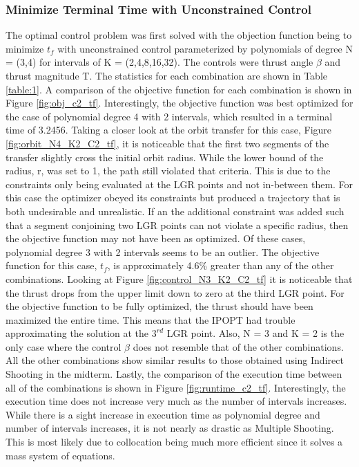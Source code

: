 \documentclass[]{article}
\begin{document}
    \subsubsection{Minimize Terminal Time with Unconstrained Control}
	 The optimal control problem was first solved with the objection function being to minimize \(t_f\) with unconstrained control parameterized by polynomials of degree N = (3,4) for intervals of K = (2,4,8,16,32). The controls were thrust angle \(\beta\) and thrust magnitude T. The statistics for each combination are shown in Table \ref{table:1}. A comparison of the objective function for each combination is shown in Figure \ref{fig:obj_c2_tf}. Interestingly, the objective function was best optimized for the case of polynomial degree 4 with 2 intervals, which resulted in a terminal time of 3.2456. Taking a closer look at the orbit transfer for this case, Figure \ref{fig:orbit_N4_K2_C2_tf}, it is noticeable that the first two segments of the transfer slightly cross the initial orbit radius. While the lower bound of the radius, r, was set to 1, the path still violated that criteria. This is due to the constraints only being evaluated at the LGR points and not in-between them. For this case the optimizer obeyed its constraints but produced a trajectory that is both undesirable and unrealistic. If an the additional constraint was added such that a segment conjoining two LGR points can not violate a specific radius, then the objective function may not have been as optimized. Of these cases, polynomial degree 3 with 2 intervals seems to be an outlier. The objective function for this case, \(t_f\), is approximately 4.6\% greater than any of the other combinations. Looking at Figure \ref{fig:control_N3_K2_C2_tf} it is noticeable that the thrust drops from the upper limit down to zero at the third LGR point. For the objective function to be fully optimized, the thrust should have been maximized the entire time. This means that the IPOPT had trouble approximating the solution at the \(3^{rd}\) LGR point. Also, N = 3 and K = 2 is the only case where the control \(\beta\) does not resemble that of the other combinations. All the other combinations show similar results to those obtained using Indirect Shooting in the midterm. Lastly, the comparison of the execution time between all of the combinations is shown in Figure \ref{fig:runtime_c2_tf}. Interestingly, the execution time does not increase very much as the number of intervals increases. While there is a sight increase in execution time as polynomial degree and number of intervals increases, it is not nearly as drastic as Multiple Shooting. This is most likely due to collocation being much more efficient since it solves a mass system of equations.
\end{document}
